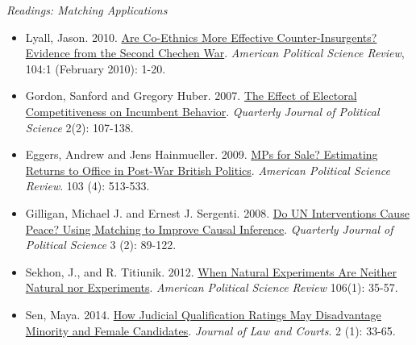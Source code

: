 \documentclass{article}
\begin{document}
\emph{Readings: Matching Applications}
\begin{itemize}
\item Lyall, Jason. 2010.
  \href{http://journals.cambridge.org/action/displayFulltext?type=1&pdftype=1&fid=7449380&jid=PSR&volumeId=104&issueId=01&aid=7449372}
  {Are Co-Ethnics More Effective Counter-Insurgents? Evidence from the
    Second Chechen War}. \textit{American Political Science Review},
  104:1 (February 2010): 1-20.
\item Gordon, Sanford and Gregory Huber. 2007.
  \href{http://www.nowpublishers.com/article/Details/QJPS-6035} {The
    Effect of Electoral Competitiveness on Incumbent
    Behavior}. \textit{Quarterly Journal of Political Science} 2(2): 107-138.
\item Eggers, Andrew and Jens Hainmueller. 2009.
  \href{https://web.stanford.edu/~jhain/Paper/APSR2009.pdf} {MPs for Sale?
    Estimating Returns to Office in Post-War British
    Politics}. \textit{American Political Science Review}. 103 (4): 513-533.
\item Gilligan, Michael J. and Ernest J. Sergenti. 2008.
  \href{http://nowpublishers.com/article/Details/QJPS-7051}
  {Do UN Interventions Cause Peace? Using Matching to Improve Causal
    Inference}. \textit{Quarterly Journal of Political Science} 3 (2): 89-122.
\item Sekhon, J., and R. Titiunik. 2012. \href{http://www-personal.umich.edu/~titiunik/papers/SekhonTitiunik2012_APSR.pdf}{When Natural
  Experiments Are Neither Natural nor Experiments}. \textit{American
    Political Science Review} 106(1): 35-57.
\item Sen, Maya. 2014. \href{http://scholar.harvard.edu/files/msen/files/sen_ratings.pdf}{How Judicial Qualification Ratings May Disadvantage Minority and Female Candidates}. \textit{Journal of Law and Courts}. 2 (1): 33-65.

\end{itemize}
\end{document}
